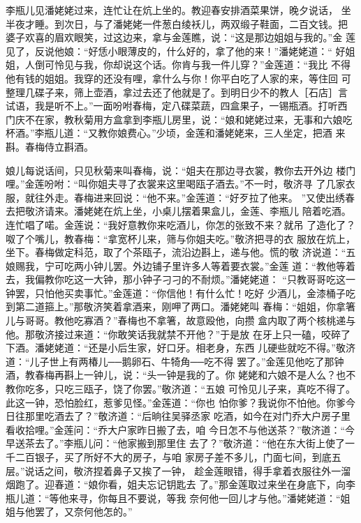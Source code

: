 李瓶儿见潘姥姥过来，连忙让在炕上坐的。教迎春安排酒菜果饼，晚夕说话，
坐半夜才睡。到次日，与了潘姥姥一件葱白绫袄儿，两双缎子鞋面，二百文钱。把
婆子欢喜的眉欢眼笑，过这边来，拿与金莲瞧，说：“这是那边姐姐与我的。”金
莲见了，反说他娘：“好恁小眼薄皮的，什么好的，拿了他的来！”潘姥姥道：“
好姐姐，人倒可怜见与我，你却说这个话。你肯与我一件儿穿？”金莲道：“我比
不得他有钱的姐姐。我穿的还没有哩，拿什么与你！你平白吃了人家的来，等住回
可整理几碟子来，筛上壶酒，拿过去还了他就是了。到明日少不的教人［石店］言
试语，我是听不上。”一面吩咐春梅，定八碟菜蔬，四盒果子，一锡瓶酒。打听西
门庆不在家，教秋菊用方盒拿到李瓶儿房里，说：“娘和姥姥过来，无事和六娘吃
杯酒。”李瓶儿道：“又教你娘费心。”少顷，金莲和潘姥姥来，三人坐定，把酒
来斟。春梅侍立斟酒。

娘儿每说话间，只见秋菊来叫春梅，说：“姐夫在那边寻衣裳，教你去开外边
楼门哩。”金莲吩咐：“叫你姐夫寻了衣裳来这里喝瓯子酒去。”不一时，敬济寻
了几家衣服，就往外走。春梅进来回说：“他不来。”金莲道：“好歹拉了他来。
”又使出绣春去把敬济请来。潘姥姥在炕上坐，小桌儿摆着果盒儿，金莲、李瓶儿
陪着吃酒。连忙唱了喏。金莲说：“我好意教你来吃酒儿，你怎的张致不来？就吊
了造化了？呶了个嘴儿，教春梅：“拿宽杯儿来，筛与你姐夫吃。”敬济把寻的衣
服放在炕上，坐下。春梅做定科范，取了个茶瓯子，流沿边斟上，递与他。慌的敬
济说道：“五娘赐我，宁可吃两小钟儿罢。外边铺子里许多人等着要衣裳。”金莲
道：“教他等着去，我偏教你吃这一大钟，那小钟子刁刁的不耐烦。”潘姥姥道：
“只教哥哥吃这一钟罢，只怕他买卖事忙。”金莲道：“你信他！有什么忙！吃好
少酒儿，金漆桶子吃到第二道箍上。”那敬济笑着拿酒来，刚呷了两口。潘姥姥叫
春梅：“姐姐，你拿箸儿与哥哥。教他吃寡酒？”春梅也不拿箸，故意殴他，向攒
盒内取了两个核桃递与他。那敬济接过来道：“你敢笑话我就禁不开他？”于是放
在牙上只一磕，咬碎了下酒。潘姥姥道：“还是小后生家，好口牙。相老身，东西
儿硬些就吃不得。”敬济道：“儿子世上有两椿儿──鹅卵石、牛犄角──吃不得
罢了。”金莲见他吃了那钟酒，教春梅再斟上一钟儿，说：“头一钟是我的了。你
姥姥和六娘不是人么？也不教你吃多，只吃三瓯子，饶了你罢。”敬济道：“五娘
可怜见儿子来，真吃不得了。此这一钟，恐怕脸红，惹爹见怪。”金莲道：“你也
怕你爹？我说你不怕他。你爹今日往那里吃酒去了？”敬济道：“后晌往吴驿丞家
吃酒，如今在对门乔大户房子里看收拾哩。”金莲问：“乔大户家昨日搬了去，咱
今日怎不与他送茶？”敬济道：“今早送茶去了。”李瓶儿问：“他家搬到那里住
去了？”敬济道：“他在东大街上使了一千二百银子，买了所好不大的房子，与咱
家房子差不多儿，门面七间，到底五层。”说话之间，敬济捏着鼻子又挨了一钟，
趁金莲眼错，得手拿着衣服往外一溜烟跑了。迎春道：“娘你看，姐夫忘记钥匙去
了。”那金莲取过来坐在身底下，向李瓶儿道：“等他来寻，你每且不要说，等我
奈何他一回儿才与他。”潘姥姥道：“姐姐与他罢了，又奈何他怎的。”


